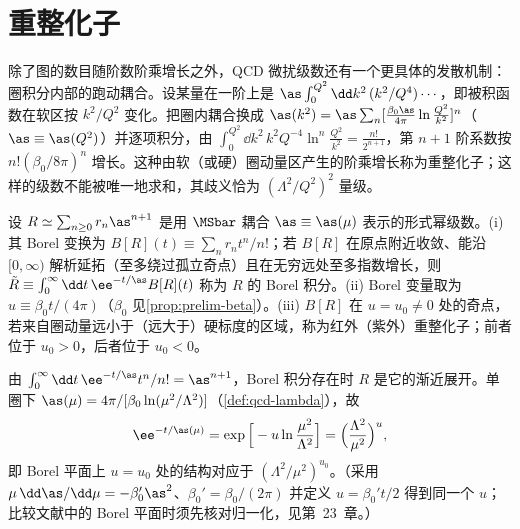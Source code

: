 \section{重整化子}\label{sec:power-renormalons}

除了图的数目随阶数阶乘增长之外，QCD 微扰级数还有一个更具体的发散机制：圈积分内部的跑动耦合。设某量在一阶上是 $\as\int_0^{Q^2}\dd k^2\,(k^2/Q^4)\cdots$，即被积函数在软区按 $k^2/Q^2$ 变化。把圈内耦合换成 $\as(k^2)=\as\sum_n[\frac{\beta_0\as}{4\pi}\ln\frac{Q^2}{k^2}]^n$（$\as\equiv\as(Q^2)$）并逐项积分，由 $\int_0^{Q^2}\dd k^2\,k^2Q^{-4}\ln^n\frac{Q^2}{k^2}=\frac{n!}{2^{n+1}}$，第 $n+1$ 阶系数按 $n!(\beta_0/8\pi)^n$ 增长。这种由软（或硬）圈动量区产生的阶乘增长称为重整化子\cite{tHooft1979}；这样的级数不能被唯一地求和，其歧义恰为 $(\Lambda^2/Q^2)^2$ 量级。

\begin{definition}\label{def:power-borel}
设 $R\simeq\sum_{n\ge0}r_n\as^{n+1}$ 是用 $\MSbar$ 耦合 $\as\equiv\as(\mu)$ 表示的形式幂级数。(i) 其 Borel 变换为 $B[R](t)\equiv\sum_nr_nt^n/n!$；若 $B[R]$ 在原点附近收敛、能沿 $[0,\infty)$ 解析延拓（至多绕过孤立奇点）且在无穷远处至多指数增长，则 $\tilde R\equiv\int_0^\infty\dd t\,\ee^{-t/\as}B[R](t)$ 称为 $R$ 的 Borel 积分。(ii) Borel 变量取为 $u\equiv\beta_0t/(4\pi)$（$\beta_0$ 见\cref{prop:prelim-beta}）。(iii) $B[R]$ 在 $u=u_0\ne0$ 处的奇点，若来自圈动量远小于（远大于）硬标度的区域，称为红外（紫外）重整化子；前者位于 $u_0>0$，后者位于 $u_0<0$。
\end{definition}

由 $\int_0^\infty\dd t\,\ee^{-t/\as}t^n/n!=\as^{n+1}$，Borel 积分存在时 $R$ 是它的渐近展开。单圈下 $\as(\mu)=4\pi/[\beta_0\ln(\mu^2/\Lambda^2)]$（\cref{def:qcd-lambda}），故
\begin{equation}\label{eq:power-borel-lambda}
\ee^{-t/\as(\mu)}=\exp\Big[-u\ln\frac{\mu^2}{\Lambda^2}\Big]=\Big(\frac{\Lambda^2}{\mu^2}\Big)^{u},
\end{equation}
即 Borel 平面上 $u=u_0$ 处的结构对应于 $(\Lambda^2/\mu^2)^{u_0}$。（采用 $\mu\,\dd\as/\dd\mu=-\beta_0'\as^2$、$\beta_0'=\beta_0/(2\pi)$ 并定义 $u=\beta_0't/2$ 得到同一个 $u$；比较文献中的 Borel 平面时须先核对归一化，见第~23~章。）

